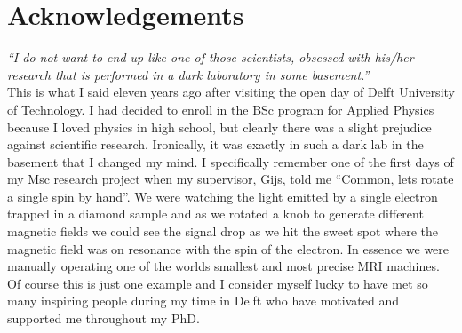 %
\chapter{Acknowledgements}

\textit{``I do not want to end up like one of those scientists, obsessed with his/her research that is performed in a dark laboratory in some basement.''}
\\

This is what I said eleven years ago after visiting the open day of Delft University of Technology. I had decided to enroll in the BSc program for Applied Physics because I loved physics in high school, but clearly there was a slight prejudice against scientific research. Ironically, it was exactly in such a dark lab in the basement that I changed my mind. I specifically remember one of the first days of my Msc research project when my supervisor, Gijs, told me  ``Common, lets rotate a single spin by hand''. We were watching the light emitted by a single electron trapped in a diamond sample and as we rotated a knob to generate different magnetic fields we could see the signal drop as we hit the sweet spot where the magnetic field was on resonance with the spin of the electron. In essence we were manually operating one of the worlds smallest and most precise MRI machines.
Of course this is just one example and I consider myself lucky to have met so many inspiring people during my time in Delft who have motivated and supported me throughout my PhD.\\

